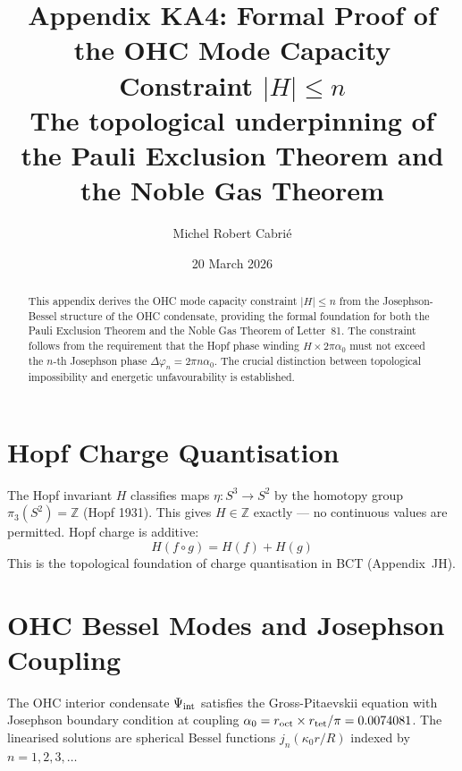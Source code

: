 \documentclass[aps,prl,twocolumn,showpacs,superscriptaddress]{revtex4-2}
\begin{document}
\title{Appendix KA4: Formal Proof of the OHC Mode Capacity Constraint
$|H|\leq n$\\
The topological underpinning of the Pauli Exclusion Theorem
and the Noble Gas Theorem}

\author{Michel Robert Cabri\'e}
\date{20 March 2026}

\begin{abstract}
This appendix derives the OHC mode capacity constraint $|H|\leq n$ 
from the Josephson-Bessel structure of the OHC condensate, providing 
the formal foundation for both the Pauli Exclusion Theorem and the 
Noble Gas Theorem of Letter~81. The constraint follows from the 
requirement that the Hopf phase winding $H\times2\pi\alpha_0$ must 
not exceed the $n$-th Josephson phase $\Delta\varphi_n = 2\pi n\alpha_0$.
The crucial distinction between topological impossibility and energetic 
unfavourability is established.
\end{abstract}

\maketitle

\section{Hopf Charge Quantisation}

The Hopf invariant $H$ classifies maps $\eta: S^3\to S^2$ by the 
homotopy group $\pi_3(S^2) = \mathbb{Z}$ (Hopf 1931). This gives 
$H\in\mathbb{Z}$ exactly --- no continuous values are permitted. 
Hopf charge is additive:
\begin{equation}
    H(f\circ g) = H(f) + H(g)
\end{equation}
This is the topological foundation of charge quantisation in BCT 
(Appendix~JH).

\section{OHC Bessel Modes and Josephson Coupling}

The OHC interior condensate $\Psi_{\rm int}$ satisfies the 
Gross-Pitaevskii equation with Josephson boundary condition at 
coupling $\alpha_0 = r_{\rm oct}\times r_{\rm tet}/\pi = 0.0074081$. 
The linearised solutions are spherical Bessel functions 
$j_n(\kappa_0 r/R)$ indexed by $n = 1,2,3,\ldots$
\end{document}
